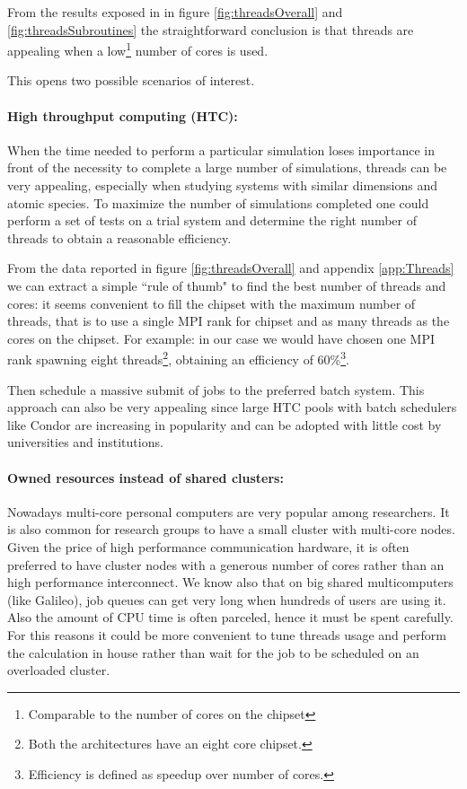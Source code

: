 \documentclass[a4paper,12pt]{article}
\begin{document}
From the results exposed in in figure \ref{fig:threadsOverall} and \ref{fig:threadsSubroutines} the straightforward conclusion is that threads are appealing when a low\footnote{Comparable to the number of cores on the chipset} number of cores is used.

This opens two possible scenarios of interest.

\paragraph{High throughput computing (HTC):} 
When the time needed to perform a particular simulation loses importance in front of the necessity to complete a large number of simulations, threads can be very appealing, especially when studying systems with similar dimensions and atomic species.
To maximize the number of simulations completed one could perform a set of tests on a trial system and determine the right number of threads to obtain a reasonable efficiency.

From the data reported in figure \ref{fig:threadsOverall} and appendix \ref{app:Threads} we can extract a simple ``rule of thumb" to find the best number of threads and cores:
it seems convenient to fill the chipset with the maximum number of threads, that is to use a single MPI rank for chipset and as many threads as the cores on the chipset.
For example: in our case we would have chosen one MPI rank spawning eight threads\footnote{Both the architectures have an eight core chipset.}, obtaining an efficiency of 60\%\footnote{Efficiency is defined as speedup over number of cores.}.

Then schedule a massive submit of jobs to the preferred batch system. 
This approach can also be very appealing since large HTC pools with batch schedulers like Condor\cite{Condor} are increasing in popularity and can be adopted with little cost by universities and institutions.

\paragraph{Owned resources instead of shared clusters:}
Nowadays multi-core personal computers are very popular among researchers. 
It is also common for research groups to have a small cluster with multi-core nodes.
Given the price of high performance communication hardware, it is often preferred to have cluster nodes with a generous number of cores rather than an high performance interconnect.
We know also that on big shared multicomputers (like Galileo), job queues can get very long when hundreds of users are using it. Also the amount of CPU time is often parceled, hence it must be spent carefully.
For this reasons it could be more convenient to tune threads usage and perform the calculation in house rather than wait for the job to be scheduled on an overloaded cluster.
\end{document}
